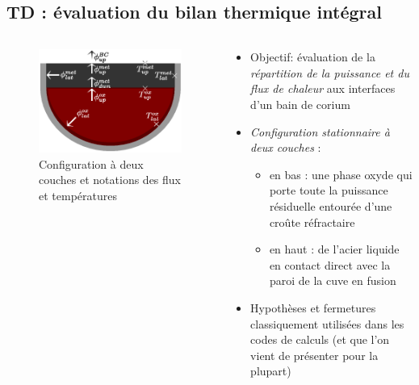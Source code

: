 \documentclass[usenames,dvipsnames]{beamer}
\renewcommand{\emph}[1]{\textcolor{cea8}{\textit{#1}}}
\begin{document}
\subsection{TD : évaluation du bilan thermique intégral}
\begin{frame}[fragile]
\begin{columns}[T]
    \begin{column}{0.4\textwidth}
      \begin{figure}[H]
\centering \includegraphics[height=0.4\textheight]{Figures/TD_2layer.eps}
\caption{Configuration à deux couches et notations des flux et températures}
      \end{figure}
    \end{column}
    \begin{column}{0.6\textwidth}
    \begin{itemize}
    \item Objectif: évaluation de la \emph{répartition de la puissance et du flux de chaleur} aux interfaces d'un bain de corium
    \item \emph{Configuration stationnaire à deux couches} :
    \begin{itemize} 
    \item en bas : une phase oxyde qui porte toute la puissance résiduelle entourée d'une croûte réfractaire 
    \item en haut : de l'acier liquide en contact direct avec la paroi de la cuve en fusion
    \end{itemize}
    \item Hypothèses et fermetures classiquement utilisées dans les codes de calculs (et que l'on vient de présenter pour la plupart)

\end{itemize}
\end{column}
\end{columns}
\end{frame}
\end{document}
